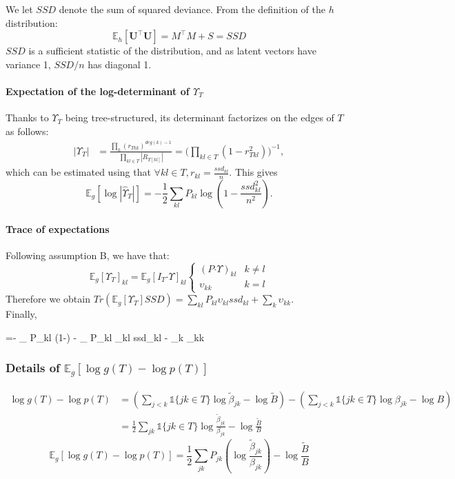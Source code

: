 \documentclass[11pt,a4paper]{article}
\newcommand*\lesswidefbox[1]{\fbox{\hspace{2em}#1\hspace{2em}}}
\newcommand{\Ubf}{\boldsymbol{U}}
\newcommand{\Esp}{\mathds{E}}
\newcommand{\had}{\boldsymbol{\cdot}}
\begin{document}
 We let $SSD$ denote the sum of squared deviance. From the definition of the $h$ distribution: $$ \Esp_h[\Ubf^\intercal \Ubf] = M^\intercal M + S = SSD$$
  $SSD$ is a sufficient statistic of the distribution, and  as latent vectors have variance 1, $SSD/n$ has diagonal 1.
 
\paragraph{Expectation of the log-determinant of $\Upsilon_T$\\}
Thanks to $\Upsilon_T$ being tree-structured, its determinant factorizes on the edges of $T$ as follows:
\begin{align*}
|\Upsilon_T| &=\frac{\prod_k (r_{Tkk})^{deg(k)-1}}{\prod_{kl \in T} |R_{T[kl]}|} =  \Big(\prod_{kl \in T} (1-r_{Tkl}^2)\Big)^{-1},
 \end{align*}
 which can be estimated using that $\forall kl \in T, r_{kl} = \frac{ssd_{kl}}{n}$.
 This gives $$\Esp_g[\log|\hat{\Upsilon}_T|]=-\frac{1}{2}\sum_{kl} P_{kl}\log(1-\frac{ssd_{kl}^2}{n^2}).$$
\paragraph{Trace of expectations\\}
Following assumption B, we have that:
  \[ \Esp_g[\Upsilon_T]_{kl}  =  \Esp_g[I_T\had\Upsilon]_{kl} \left\{ 
\begin{array}{cc}
(P \had \Upsilon)_{kl} & k \neq l\\
\upsilon_{kk} & k = l
\end{array}
\right.
\]
Therefore we obtain $Tr(\Esp_g[\Upsilon_T] SSD) = \sum_{kl} P_{kl} \upsilon_{kl} ssd_{kl} + \sum_k \upsilon_{kk} $.\\

Finally, 
\begin{empheq}[box=\lesswidefbox]{align*}
\Esp_{gh} [\log p(\Ubf \mid T)] =- \sum _{} P_{kl} \log \Big(1-\Big) - \sum_{} P_{kl} \upsilon_{kl} ssd_{kl} -  \sum_{k} \upsilon_{kk} 
 \end{empheq}
\subsubsection{Details of $\Esp_g[\log g(T) - \log p(T)]$}
\begin{align*}
\log g(T) - \log p(T) &= \left(  \sum_{j<k} \mathds{1}\{jk \in T\} \log \widetilde{\beta}_{jk} - \log \widetilde{B}\right) - \left(  \sum_{j<k} \mathds{1}\{jk \in T\} \log {\beta}_{jk} - \log {B}\right)\\
&=\frac{1}{2}\sum_{jk} \mathds{1}\{jk \in T\} \log \frac{\widetilde{\beta}_{jk}}{{\beta}_{jk}} - \log \frac{\widetilde{B}}{B}
\end{align*}
$$\boxed{
\Esp_g[\log g(T) - \log p(T)] = \frac{1}{2}\sum_{jk}P_{jk} \left(\log \frac{\widetilde{\beta}_{jk}}{{\beta}_{jk}}\right) - \log \frac{\widetilde{B}}{B} }$$
\end{document}

